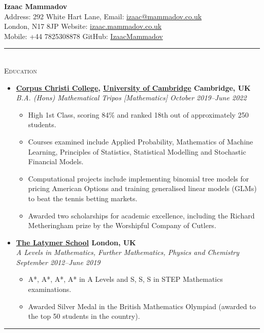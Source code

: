 \documentclass[10pt]{article}
\begin{document}
	\noindent\textbf{\LARGE Izaac Mammadov}\\
	Address: 292 White Hart Lane, \hfill Email: \href{mailto:izaac@mammadov.co.uk}{izaac@mammadov.co.uk}\\
	\phantom{Address: }London, N17 8JP \hfill Website: \href{https://izaac.mammadov.co.uk}{izaac.mammadov.co.uk}\\
	Mobile: +44 7825308878 \hfill GitHub: \href{https://github.com/IzaacMammadov}{IzaacMammadov}
	\rule{\textwidth}{0.4pt}\\[0.2cm]
	\textsc{\Large Education}
	\begin{itemize}[left=0pt]
		\item \textbf{\href{https://www.corpus.cam.ac.uk/}{Corpus Christi College}, \href{https://www.cam.ac.uk/}{University of Cambridge} \hfill Cambridge, UK}\\
		\textit{B.A. (Hons) Mathematical Tripos [Mathematics] \hfill October 2019--June 2022}
		\begin{itemize}
			\item High 1st Class, scoring 84\% and ranked 18th out of approximately 250 students.
			\item Courses examined include Applied Probability, Mathematics of Machine Learning, Principles of Statistics, Statistical Modelling and Stochastic Financial Models.
			\item Computational projects include implementing binomial tree models for pricing American Options and training generalised linear models (GLMs) to beat the tennis betting markets.
			\item Awarded two scholarships for academic excellence, including the Richard Metheringham prize by the Worshipful Company of Cutlers.
		\end{itemize}
		\item \textbf{\href{https://www.latymer.co.uk/}{The Latymer School} \hfill London, UK}\\
		\textit{A Levels in Mathematics, Further Mathematics, Physics and Chemistry \hfill September 2012--June 2019}
		\begin{itemize}
			\item A*, A*, A*, A* in A Levels and S, S, S in STEP Mathematics examinations.
			\item Awarded Silver Medal in the British Mathematics Olympiad (awarded to the top 50 students in the country).
		\end{itemize}
	\end{itemize}
	\rule{\textwidth}{0.4pt}\\[0.2cm]
\end{document}
